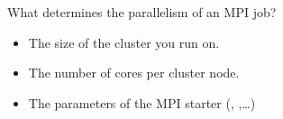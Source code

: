   What determines the parallelism of an MPI job?
  \begin{itemize}
  \item The size of the cluster you run on.
  \item The number of cores per cluster node.
  \item The parameters of the MPI starter (,
    ,\ldots)
  \end{itemize}
